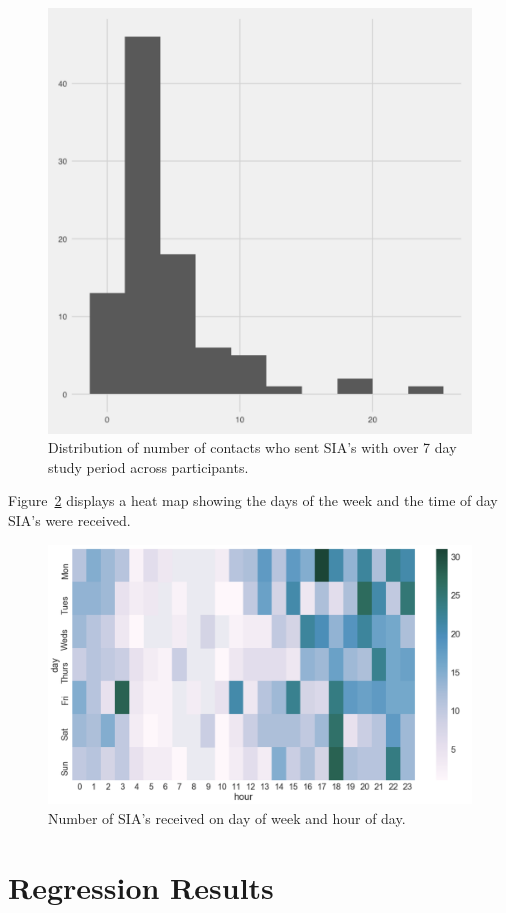 \documentclass[12pt]{nuthesis}	%
\begin{document}
\begin{figure}[h]
\centering
\includegraphics[width=.7\textwidth]{figures/sia_messages_contacts_distribution}
\caption{Distribution of number of contacts who sent SIA's with over 7 day study period across participants.}
\label{fig:sia_num_contacts}
\end{figure}

Figure~\ref{fig:sia_heatmap} displays a heat map showing the days of the week and the time of day SIA's were received.

\begin{figure}[h]
\centering
\includegraphics[width=.7\textwidth]{figures/sia_heatmap}
\caption{Number of SIA's received on day of week and hour of day.}
\label{fig:sia_heatmap}
\end{figure}


\section{Regression Results}
\end{document}
